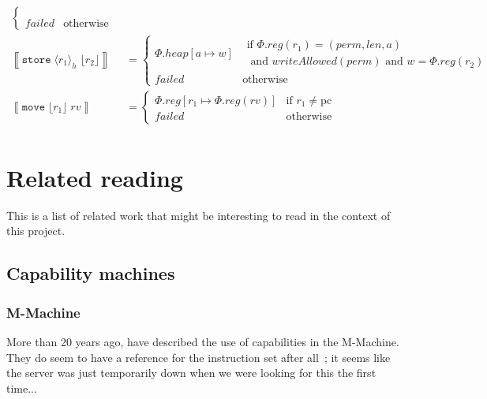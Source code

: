 \documentclass{article}
\newcommand{\update}[2]{[#1 \mapsto #2]}%
\newcommand{\var}[1]{\mathit{#1}}
\newcommand{\rv}{rv}
\newcommand{\pcreg}{\mathrm{pc}}
\newcommand{\addr}{a}
\newcommand{\len}{len}
\newcommand{\reg}{reg}
\newcommand{\heap}{heap}
\newcommand{\perm}{perm}
\newcommand{\failed}{failed}
\newcommand{\writeAllowed}[1]{\mathit{writeAllowed}(#1)}
\newcommand{\refreg}[1]{\lfloor #1 \rfloor}
\newcommand{\refheap}[1]{\langle #1 \rangle_h}
\newcommand{\instr}[1]{\mathtt{#1}}
\newcommand{\twoinstr}[3]{\instr{#1} \; #2 \; #3}
\newcommand{\move}[2]{\twoinstr{move}{#1}{#2}}
\newcommand{\store}[2]{\twoinstr{store}{#1}{#2}}
\newcommand{\sem}[1]{\left\llbracket #1 \right\rrbracket}
\begin{document}
\begin{align*}
\begin{cases}
\begin{array}{l}
                                   \end{array}\\
                                   \failed & \text{otherwise }
                                 \end{cases}\\
 \sem{\store{\refheap{r_1}}{\refreg{r_2}}} & =
                                 \begin{cases}
                                   \Phi.\heap\update{\addr}{\var{w}} &
                                   \begin{array}{l}
                                     \text{if }\Phi.\reg(r_1) = (\perm,\len,\addr)\\
                                     \text{  and }\writeAllowed{\perm} \text{ and } \var{w} = \Phi.\reg(r_2)
                                   \end{array}\\
                                   \failed & \text{otherwise }
                                 \end{cases}\\
 \sem{\move{\refreg{r_1}}{\rv}} & =
                                 \begin{cases}
                                   \Phi.\reg\update{r_1}{\Phi.\reg(\rv)} & \text{if $r_1 \neq \pcreg$} \\
                                   \failed   & \text{otherwise }
                                 \end{cases}\\
\end{align*}

\section{Related reading}
\label{sec:related-reading}

This is a list of related work that might be interesting to read in the context
of this project.

\subsection{Capability machines}
\label{sec:rw-cap-machines}

\subsubsection{M-Machine}
More than 20 years ago, \cite{Carter:1994:HSF:195473.195579} have described the
use of capabilities in the M-Machine. They do seem to have a reference for the
instruction set after all~\citep{Dally1997Memo59}; it seems like the server was
just temporarily down when we were looking for this the first time...
\end{document}
